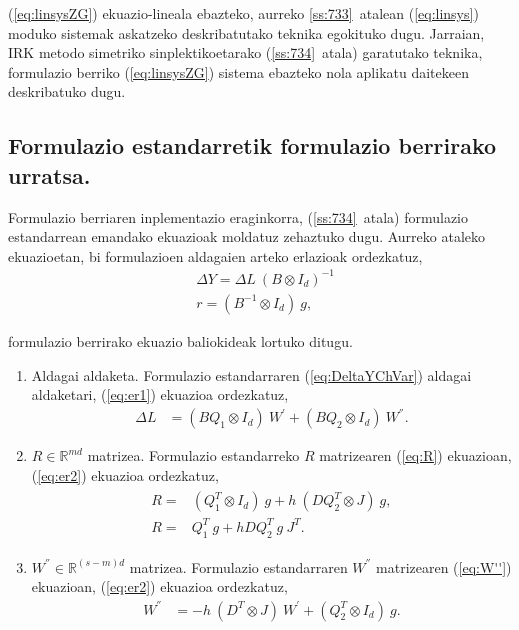 (\ref{eq:linsysZG}) ekuazio-lineala  ebazteko, aurreko  \ref{ss:733}~atalean (\ref{eq:linsys}) moduko sistemak askatzeko deskribatutako teknika egokituko dugu. Jarraian, IRK metodo simetriko sinplektikoetarako (\ref{ss:734}~atala) garatutako teknika, formulazio berriko (\ref{eq:linsysZG}) sistema ebazteko nola aplikatu daitekeen deskribatuko dugu.

\subsection*{Formulazio estandarretik formulazio berrirako urratsa.}

Formulazio berriaren inplementazio eraginkorra, (\ref{ss:734}~atala) formulazio estandarrean emandako ekuazioak  moldatuz zehaztuko dugu.
Aurreko ataleko ekuazioetan, bi formulazioen aldagaien arteko erlazioak ordezkatuz,
\begin{align}
\label{eq:er1}
&\Delta Y = \Delta L \ (B \otimes I_d)^{-1} \\ 
\label{eq:er2}
&r=(B^{-1} \otimes I_d) \ g,
\end{align}

formulazio berrirako  ekuazio baliokideak lortuko ditugu.
\begin{enumerate}

\item Aldagai aldaketa.
Formulazio estandarraren (\ref{eq:DeltaYChVar}) aldagai aldaketari, (\ref{eq:er1}) ekuazioa ordezkatuz,
\begin{align}
\Delta L &=(B Q_1 \otimes I_d) \ W^{'}+(B Q_2 \otimes I_d) \ W^{''}.
\end{align}

\item $R\in \mathbb{R}^{md}$ matrizea.
Formulazio estandarreko $R$ matrizearen (\ref{eq:R}) ekuazioan, (\ref{eq:er2}) ekuazioa ordezkatuz,
\begin{align}
\begin{split}
R=&(Q_1^T \otimes I_d) \ g + h \ (D Q_2^T \otimes J) \ g,  \\
R=& Q_1^T \ g  + h D Q_2^T \ g \ J^T.
\end{split}
\end{align}

\item $W^{''}\in \mathbb{R}^{(s-m)d}$ matrizea.
Formulazio estandarraren $W^{''}$ matrizearen (\ref{eq:W''}) ekuazioan, (\ref{eq:er2}) ekuazioa ordezkatuz,
\begin{align}
W^{''}&= -h \ (D^T \otimes J) \ W^{'}+ (Q_2^T \otimes I_d) \ g.
\end{align}


\end{enumerate}



